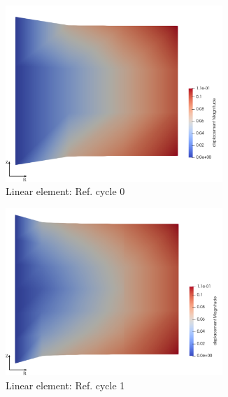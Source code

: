 \documentclass[11pt,a4paper,final]{article}
\begin{document}
\begin{figure}[h!]
\centering
\begin{subfigure}[b]{0.35\textwidth}
\centering
\includegraphics[width=0.9\textwidth]{patch_uniform_grid_ref_0.pdf}
\caption{Linear element: Ref. cycle 0}
\label{fig:1.3.1}
\end{subfigure}
\begin{subfigure}[b]{0.35\textwidth}
\centering
\includegraphics[width=0.9\textwidth]{patch_uniform_grid_ref_1.pdf}
\caption{Linear element: Ref. cycle 1}
\label{fig:1.3.2}
\end{subfigure}
\begin{subfigure}[b]{0.35\textwidth}
\centering

\end{subfigure}
\end{figure}
\end{document}

